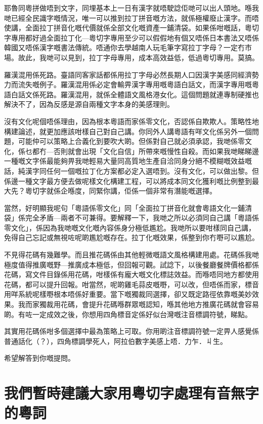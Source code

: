 \documentclass[a5paper, 10pt, openany]{book} %
\begin{document}
耶魯同粵拼做唔到文字，同埋基本上一日有漢字就唔駛諗佢哋可以出人頭地。喺我哋已經全民識字嘅情況，唯一可以推到拉丁拼音嘅方法，就係極權廢止漢字。而唔使講，全面拉丁拼音化嘅代價就係全部文化嘅資產一鋪清袋。如果係咁嘅話，粵切字專用都好過全面拉丁化—粵切字專用至少可以假假地有個又唔係日本書法又唔係韓國又唔係漢字嘅書法傳統。唔通你去學越南人玩毛筆字寫拉丁字母？一定冇市場。故此，我哋可以見到，拉丁字母專用，成本高效益低，低過粵切專用。莫搞。

羅漢混用係死路。臺語同客家話都係用拉丁字母必然長期人口因漢字美感同經濟勢力而流失嘅例子。羅漢混用係必定會輸畀漢字專用嘅粵語白話文，而漢字專用嘅粵語白話文係死路。羅漢混用，就係全體語文風格港女化。這個問題就連專制硬推也解決不了，因為反感是源自兩種文字本身的美感理則。

沒有文化呢個唔係理由，因為根本粵語而家係零文化，否認係自欺欺人。策略性地構建論述，就更加應該咁樣自己對自己講。你同外人講粵語有咩文化係另外一個問題，可能仲可以策略上合義化到要吹大啲。但係對自己就必須承認，我哋係零文化，係乜都冇—否則就會出現「文化自信」所帶來嘅慢性自殺。而如果我哋睇睇邊一種嘅文字係最能夠畀我哋輕易大量同高質地生產自洽同身分絕不模糊嘅效益嘅話，純漢字同任何一個嘅拉丁化方案都必定入選唔到。沒有文化，可以做出黎。但係邊一種文字最方便去做呢樣文化構建工程，可以將成本同文化獲利嘅比例整到最大先？粵切字就係企喺度，同緊你講，佢係一個非常有潛能嘅選擇。

當然，好明顯我呢句「粵語係零文化」同「全面拉丁拼音化就會粵語文化一鋪清袋」係完全矛盾—兩者不可兼得。要解釋一下，我哋之所以必須同自己講「粵語係零文化」，係因為我哋嘅文化嘅內容係身分極低尷尬。我哋所以要咁樣同自己講，免得自己忘記或無視咗呢啲尷尬嘅存在。拉丁化嘅效果，係整到你冇嘢可以尷尬。

不見得花碼有幾難學。而且推花碼係由其他輕微嘅語文風格構建用處。花碼係我哋極度值得推廣嘅野—推廣成本極低，但回報可觀。試諗下，以後餐廳餐牌價格都係花碼，寫文件目錄係用花碼，咁樣係有龐大嘅文化標誌效益。而喺唔同地方都使用花碼，都可以提升回報。咁當然，呢啲雞毛蒜皮嘅嘢，可以改，但唔係而家，標音用咩系統呢樣嘢根本唔係好重要。當下嘅獨裁同選擇，卻又既定路徑依靠嘅美妙效果。我而家獨裁用花碼，會提升花碼喺群眾嘅認知，喺其他地方推廣花碼就會容易啲。有咗一定成效之後，你想用四角標音定係好似台灣嘅注音標調符號，睇點。

其實用花碼係咁多個選擇中最為策略上可取。你用啲注音標調符號一定畀人感覺係普通話化（？），四角標調學死人，阿拉伯數字美感上唔．力乍．丩生。

希望解答到你嘅提問。

\chapter{我們暫時建議大家用粵切字處理有音無字的粵詞}
\end{document}
